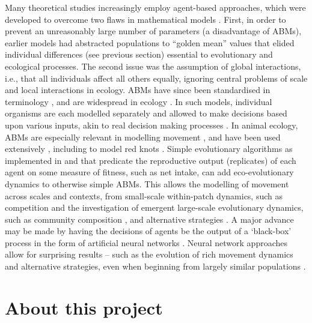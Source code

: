 Many theoretical studies increasingly employ agent-based approaches, which were developed to overcome two flaws in mathematical models \citep{huston1988}. First, in order to prevent an unreasonably large number of parameters (a disadvantage of ABMs), earlier models had abstracted populations to ``golden mean'' values that elided individual differences (see previous section) essential to evolutionary and ecological processes. The second issue was the assumption of global interactions, i.e., that all individuals affect all others equally, ignoring central problems of scale \citep{levin1992} and local interactions \citep[see][]{legendre1993} in ecology. ABMs have since been standardised in terminology \citep{grimm2006, grimm2010}, and are widespread in ecology \citep{deangelis2018}. In such models, individual organisms are each modelled separately and allowed to make decisions based upon various inputs, akin to real decision making processes \citep{deangelis2019}. In animal ecology, ABMs are especially relevant in modelling movement \citep[reviewed in][]{deangelis2005}, and have been used extensively \citep{spiegel2017, spiegel2013, getz2015, getz2016}, including to model red knots \citep{vangils2010}. Simple evolutionary algorithms \citep[see][]{back1996} as implemented in \citet{getz2015} and \citet{netz2017} that predicate the reproductive output (replicates) of each agent on some measure of fitness, such as net intake, can add eco-evolutionary dynamics to otherwise simple ABMs. This allows the modelling of movement across scales and contexts, from small-scale within-patch dynamics, such as competition \citep[see][ for a primer]{keddy2001} and the investigation of emergent large-scale evolutionary dynamics, such as community composition \citep[\emph{movement guilds};][]{getz2015}, and alternative strategies \citep{netz2017}. A major advance may be made by having the decisions of agents be the output of a `black-box' process in the form of artificial neural networks \citep[ANNs; see][ for example implementation]{lek1999, enquist2013, netz2017}. Neural network approaches allow for surprising results -- such as the evolution of rich movement dynamics and alternative strategies, even when beginning from largely similar populations \citep{netz2017, }.

\part{About this project}

